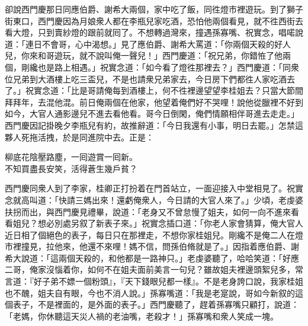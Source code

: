 卻說西門慶那日同應伯爵、謝希大兩個，{}家中吃了飯，同徃燈市裡遊玩。到了獅子街東口，西門慶因為月娘衆人都在李瓶兒家吃酒，恐怕他兩個看見，就不徃西街去看大燈，只到賣紗燈的跟前就囘了。不想轉過灣來，撞遇孫寡嘴、祝實念，唱喏說道：「連日不會哥，心中渴想。」見了應伯爵、謝希大罵道：「你兩個天殺的好人兒，你來和哥遊玩，就不說叫俺一聲兒！」西門慶道：「祝兄弟，你錯恠了他兩個，剛纔也是路上相遇。」祝實念道：「如今看了燈徃那裡去？」西門慶道：「同衆位兄弟到大酒樓上吃三盃兒，不是也請衆兄弟家去，今日房下們都徃人家吃酒去了。」祝實念道：「比是哥請俺每到酒樓上，何不徃裡邊望望李桂姐去？只當大節間拜拜年，去混他混。前日俺兩個在他家，他望着俺們好不哭哩！說他從臘裡不好到如今，大官人通影邊兒不進去看他看。哥今日倒閑，俺們情願相伴哥進去走走。」西門慶因記掛晚夕李瓶兒有約，故推辭道：「今日我還有小事，明日去罷。」怎禁這夥人死拖活拽，於是同進院中去。正是：

\begin{myquote}
柳底花陰壓路塵，一囘遊賞一囘新。\\不知買盡長安笑，活得蒼生幾戶貧？
\end{myquote}

西門慶同衆人到了李家，桂卿正打扮着在門首站立，一面迎接入中堂相見了。祝實念就高叫道：{}「快請三媽出來！還虧俺衆人，今日請的大官人來了。」少頃，老虔婆扶拐而出，與西門慶見禮畢，說道：「老身又不曾怠慢了姐夫，如何一向不進來看看姐兒？想必別處另叙了新表子來。」祝實念插口道：「你老人家會猜算，俺大官人近日相了個絕色的表子，每日只在那裡走，不想你家桂姐兒。剛纔不是俺二人在燈市裡撞見，拉他來，他還不來哩！媽不信，問孫伯脩就是了。」因指着應伯爵、謝希大說道：「這兩個天殺的，和他都是一路神只。」老虔婆聽了，哈哈笑道：「好應二哥，俺家沒惱着你，如何不在姐夫面前美言一句兒？雖故姐夫裡邊頭絮兒多，常言道：『好子弟不嫖一個粉頭』，『天下錢眼兒都一樣』。{}不是老身誇口說，我家桂姐也不醜，姐夫自有眼，今也不消人說。」孫寡嘴道：「我是老寔說，哥如今新叙的這個表子，不是裡面的，是外面的表子。」{}西門慶聽了，趕着孫寡嘴只顧打，說道：「老媽，你休聽這天災人禍的老油嘴，老殺才！」孫寡嘴和衆人笑成一塊。

